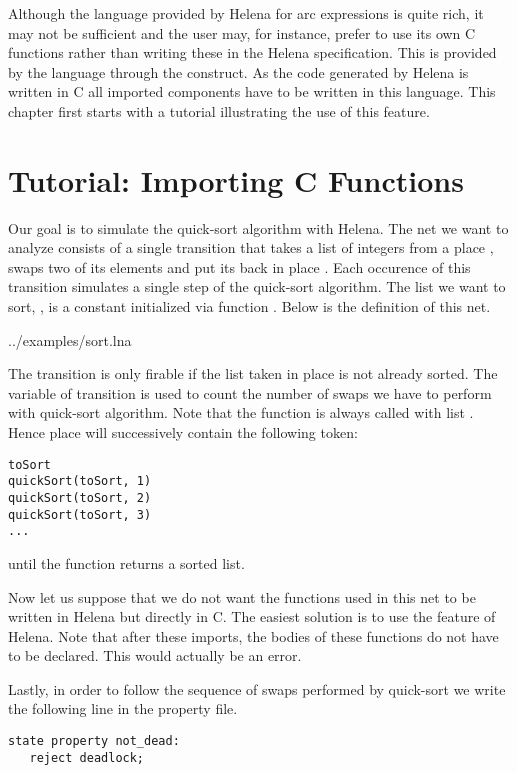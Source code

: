 Although the language provided by Helena for arc expressions is quite
rich, it may not be sufficient and the user may, for instance, prefer
to use its own C functions rather than writing these in the Helena
specification.  This is provided by the language through the
 construct.  As the code generated by Helena is written in
C all imported components have to be written in this language.  This
chapter first starts with a tutorial illustrating the use of this
feature.
\section{Tutorial: Importing C Functions}
Our goal is to simulate the quick-sort algorithm with Helena.  The net
we want to analyze consists of a single transition  that
takes a list of integers from a place , swaps two of its
elements and put its back in place .  Each occurence of
this transition simulates a single step of the quick-sort algorithm.
The list we want to sort, , is a constant initialized via
function .  Below is the definition of this net.

 {../examples/sort.lna}

The transition  is only firable if the list taken in place
 is not already sorted.  The variable  of
transition  is used to count the number of swaps we have to
perform with quick-sort algorithm.  Note that the function
 is always called with list .  Hence place
 will successively contain the following token:
\begin{lstlisting}
toSort
quickSort(toSort, 1)
quickSort(toSort, 2)
quickSort(toSort, 3)
...
\end{lstlisting}
until the function returns a sorted list.

Now let us suppose that we do not want the functions used in this net
to be written in Helena but directly in C.  The easiest solution is to
use the  feature of Helena.  Note that after these imports,
the bodies of these functions do not have to be declared.  This would
actually be an error.

Lastly, in order to follow the sequence of swaps performed by
quick-sort we write the following line in the property file.
\begin{lstlisting}
state property not_dead:
   reject deadlock;
\end{lstlisting}

